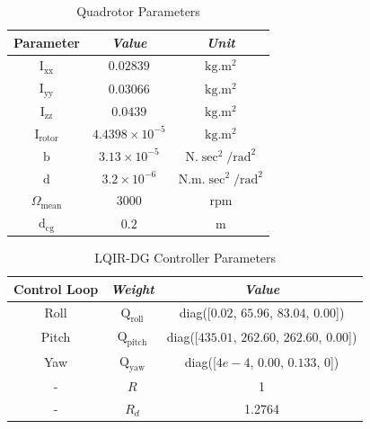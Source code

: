 \documentclass[3p,times]{elsarticle}
\begin{document}
\begin{table}[H]
	\renewcommand{\arraystretch}{1.3}
	\caption{Quadrotor Parameters}
	\begin{center}
	\begin{tabular}{c c c}
	\hline
	\textbf{Parameter} & \textbf{\textit{Value}}& \textbf{\textit{Unit}} \\
	\hline
	$\mathrm{I}_{\text{xx}}$ & $0.02839$ & $\mathrm{kg.m^2}$ \\
	$\mathrm{I}_{\text{yy}}$  & $0.03066$ & $\mathrm{kg.m^2}$\\
	$\mathrm{I}_{\text{zz}}$  & $0.0439$ & $\mathrm{kg.m^2}$ \\
	$\mathrm{I}_{\text{rotor}}$  & $4.4398\times 10^{-5}$ & $\mathrm{kg.m^2}$\\
	$\mathrm{b}$  & $3.13\times10^{-5}$ & $\mathrm{N.\sec^2/rad^2}$ \\
	$\mathrm{d}$  & $3.2\times10^{-6}$ & $\mathrm{N.m.\sec^2/rad^2}$\\
	$\Omega_{\text{mean}}$ & $3000$ & $\mathrm{rpm}$\\
	$\mathrm{d}_{\text{cg}}$  & $0.2$ & $\mathrm{m}$\\
	\hline
	\end{tabular}
	\label{tab:parameters}
	\end{center}
\end{table}


\begin{table}[H]
	\renewcommand{\arraystretch}{1.3}
	\caption{LQIR-DG Controller Parameters}
	\begin{center}
	\begin{tabular}{c c c}
	\hline
	\textbf{Control Loop} & \textbf{\textit{Weight}}& \textbf{\textit{Value}} \\
	\hline
	Roll & 
	$\boldsymbol{{\mathrm{Q_{\text{roll}}}}}$ & diag([$0.02$, $65.96$, $83.04$, $0.00$])\\
	Pitch & 
	$\boldsymbol{{\mathrm{Q_{\text{pitch}}}}}$ & diag([$435.01$, $262.60$, $262.60$, $0.00$])\\
	Yaw & 
	$\boldsymbol{{\mathrm{Q_{\text{yaw}}}}}$ & diag([$4e\!-\!4$, $0.00$, $0.133$, $0$])\\
	-& $R$ & 1\\
	-& $R_{d}$ & 1.2764\\
	\hline
	\end{tabular}
	\end{center}
	\label{tab:control weight_new}
\end{table}
\end{document}
